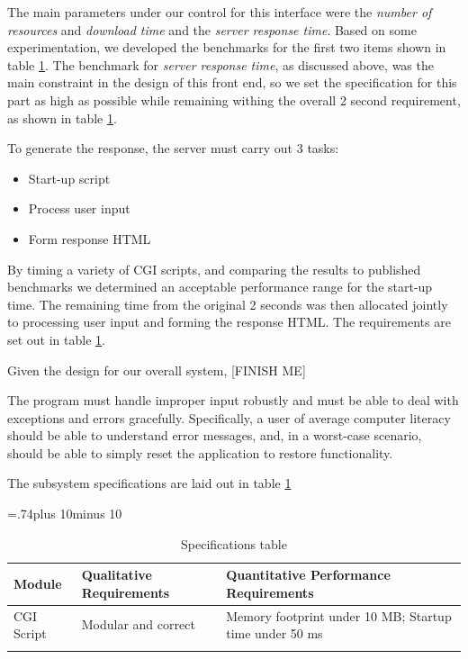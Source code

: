 The main parameters under our control for this interface were the
\emph{number of resources} and \emph{download time} and the \emph{server
  response time}. Based on some experimentation, we developed the
benchmarks for the first two items shown in table \ref{specs}. The
benchmark for \emph{server response time}, as discussed above, was the
main constraint in the design of this front end, so we set the
specification for this part as high as possible while remaining
withing the overall 2 second requirement, as shown in table
\ref{specs}.

To generate the response, the server must carry out 3 tasks:

\begin{itemize}
    \item Start-up script
    \item Process user input
    \item Form response HTML
\end{itemize}

By timing a variety of CGI scripts, and comparing the results to
published benchmarks\cite{cgi-benchmark} we determined an acceptable
performance range for the start-up time. The remaining time from the
original 2 seconds was then allocated jointly to processing user input
and forming the response HTML. The requirements are set out in table
\ref{specs}.

Given the design for our overall system, [FINISH ME]

The program must handle improper input robustly and must be able to
deal with exceptions and errors gracefully. Specifically, a user of
average computer literacy should be able to understand error messages,
and, in a worst-case scenario, should be able to simply reset the
application to restore functionality.

The subsystem specifications are laid out in table \ref{specs}
\begin{table}[htp]
  \newlength\midcolumnwidth
  \midcolumnwidth=.74\textwidth plus 10\tabcolsep minus 10\tabcolsep
  \centering
  \caption{Specifications table}
  \label{specs}
  \begin{tabular}{%
    >{\raggedright}p{}%
    p{\midcolumnwidth}%
    >{\raggedright\arraybackslash}p{}}
  \firsthline
  \bfseries Module & \bfseries Qualitative Requirements & \bfseries
  Quantitative Performance Requirements \\ \hline
  CGI Script & Modular and correct & Memory footprint under 10 MB;
  Startup time under 50 ms \\
  \lasthline
  \end{tabular}
\end{table}
